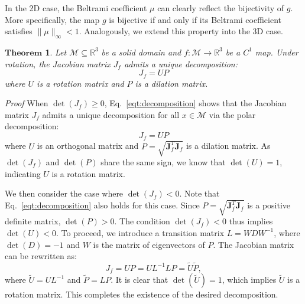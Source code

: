 \documentclass{article}
\newtheorem{theorem}[defn]{$\mathbf{Theorem}$}
\begin{document}

In the 2D case, the Beltrami coefficient $\mu$ can clearly reflect the bijectivity of $g$. More specifically, the map $g$ is bijective if and only if its Beltrami coefficient satisfies $\|\mu \|_{\infty} <1$. Analogously, we extend this property into the 3D case.
\begin{theorem}\label{sign_theorem}
    Let $\mathcal{M} \subseteq \mathbb{R}^3$ be a solid domain and $f: \mathcal{M} \to \mathbb{R}^3$ be a $C^1$ map. Under rotation, the Jacobian matrix $J_f$ admits a unique decomposition:
    \begin{equation}
        J_f = UP
    \end{equation}
    where $U$ is a rotation matrix and $P$ is a dilation matrix.
\end{theorem}
\textit{Proof}
When $\operatorname{det}(J_f)\geq 0$, Eq.~\eqref{eqt:decomposition} shows that the Jacobian matrix $J_f$ admits a unique decomposition for all $x\in\mathcal{M}$ via the polar decomposition:
\begin{equation}
    J_f = UP
\end{equation}
where $U$ is an orthogonal matrix and $P = \sqrt{\mathbf{J}^T_f\mathbf{J}_f}$ is a dilation matrix. As $\operatorname{det}(J_f)$ and $\operatorname{det}(P)$ share the same sign, we know that $\operatorname{det}(U)=1$, indicating $U$ is a rotation matrix.

We then consider the case where $\operatorname{det}(J_f)< 0$. Note that Eq.~\eqref{eqt:decomposition} also holds for this case. Since $P = \sqrt{\mathbf{J}^T_f\mathbf{J}_f}$ is a positive definite matrix, $\operatorname{det}(P)>0$. The condition $\operatorname{det}(J_f)< 0$ thus implies $\operatorname{det}(U)< 0$. To proceed, we introduce a transition matrix $L = WDW^{-1}$, where $\operatorname{det}(D)=-1$ and $W$ is the matrix of eigenvectors of $P$. The Jacobian matrix can be rewritten as:
\begin{equation}
    J_f = UP = UL^{-1}LP = \widetilde{U}\widetilde{P},
\end{equation}
where $\widetilde{U} = UL^{-1}$ and $\widetilde{P} = LP$. It is clear that $\operatorname{det}\left(\widetilde{U} \right) = 1$, which implies $\widetilde{U}$ is a rotation matrix. This completes the existence of the desired decomposition.
\end{document}

